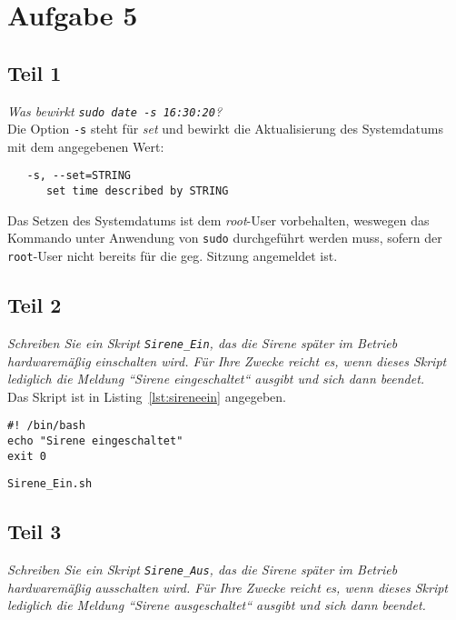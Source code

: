 \chapter{Aufgabe 5}

\section{Teil 1}
\textit{Was bewirkt \texttt{sudo date -s 16:30:20}?}\\

\noindent
Die Option \texttt{-s} steht für \textit{set} und bewirkt die Aktualisierung des Systemdatums mit dem angegebenen Wert:

\begin{verbatim}
   -s, --set=STRING
      set time described by STRING
\end{verbatim}

\noindent
Das Setzen des Systemdatums ist dem \textit{root}-User vorbehalten, weswegen das Kommando unter Anwendung  von \texttt{sudo} durchgeführt werden muss, sofern der \texttt{root}-User nicht bereits für die geg. Sitzung angemeldet ist.


\section{Teil 2}

\textit{Schreiben Sie ein Skript \texttt{Sirene\_Ein}, das die Sirene später im Betrieb
hardwaremäßig einschalten wird. Für Ihre Zwecke reicht es, wenn dieses
Skript lediglich die Meldung ``Sirene eingeschaltet`` ausgibt und sich
dann beendet.}\\

\noindent
Das Skript ist in Listing~\ref{lst:sireneein} angegeben.

\begin{listing}[H]
    \begin{verbatim}
#! /bin/bash
echo "Sirene eingeschaltet"
exit 0
    \end{verbatim}
    \caption{\texttt{Sirene\_Ein.sh}}
    \label{lst:sireneein}
\end{listing}

\section{Teil 3}

\textit{Schreiben Sie ein Skript \texttt{Sirene\_Aus}, das die Sirene später im Betrieb
hardwaremäßig ausschalten wird. Für Ihre Zwecke reicht es, wenn dieses
Skript lediglich die Meldung ``Sirene ausgeschaltet`` ausgibt und sich
dann beendet.}\\

